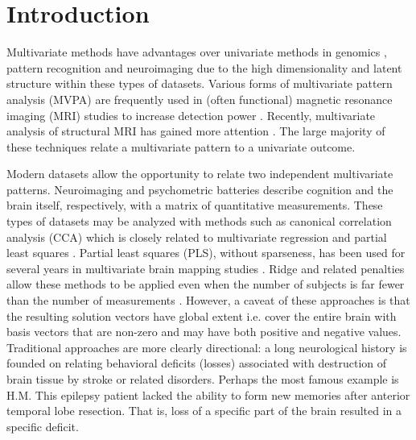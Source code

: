 \documentclass[preprint,authoryear,12pt]{elsarticle}
\begin{document}
\section{Introduction} 
Multivariate methods have advantages over univariate methods in genomics \citet{Parkhomenko2009,LeFloch2012,Hibar2011}, pattern recognition \citet{Bishop1995,roberts_parametric_1997,Tipping2001} and neuroimaging \citet{McIntosh1996,DeMartino2008,Fan2008,Tosun2012,Shamy2011} due to the high dimensionality and latent structure within these types of datasets.  Various forms of multivariate pattern analysis (MVPA) \citet{Norman2006,Habeck2008,Hanke2009,Kloppel2008681,Stonnington2010} are frequently used in (often functional) magnetic resonance imaging (MRI) studies to increase detection power  \citet{McIntosh1996,Norman2006,OToole2007,Yamashita2008}.  Recently, multivariate analysis of structural MRI has gained more attention \citet{Ryali2010,Grosenick2013,Sabuncu2011}.  The large majority of these techniques relate a multivariate pattern to a univariate outcome.  

Modern datasets allow the opportunity to relate two independent multivariate patterns.  Neuroimaging and psychometric batteries describe cognition and the brain itself, respectively, with a matrix of quantitative measurements.  These types of datasets may be analyzed with methods such as canonical correlation analysis (CCA) \citet{cherry} which is closely related to multivariate regression and partial least squares \citet{Sun2009}.  Partial least squares (PLS), without sparseness, has been used for several years in multivariate brain mapping studies \citet{McIntosh1996,Leibovitch1999,Lin2003,Addis2004a,Chen2009a}.  Ridge and related penalties allow these methods to be applied even when the number of subjects is far fewer than the number of measurements \citet{Nestor2002}.  However, a caveat of these approaches is that the resulting solution vectors have global extent i.e. cover the entire brain with basis vectors that are non-zero and may have both positive and negative values.  Traditional approaches are more clearly directional: a long neurological history is founded on relating behavioral deficits (losses) associated with destruction of brain tissue by stroke or related disorders.  Perhaps the most famous example is H.M.  This epilepsy patient lacked the ability to form new memories after anterior temporal lobe resection.  That is, loss of a specific part of the brain resulted in a specific deficit.  
\end{document}
